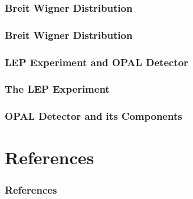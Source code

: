 \documentclass[10pt]{beamer}
\begin{document}
\subsubsection{Breit Wigner Distribution}
\begin{frame}
\frametitle{Breit Wigner Distribution}
\end{frame}
\subsubsection{LEP Experiment and OPAL Detector}
\begin{frame}
\frametitle{The LEP Experiment}
\end{frame}
\begin{frame}
\frametitle{OPAL Detector and its Components}
\end{frame}
\section*{References}
\begin{frame}
\frametitle{References}
\printbibliography
\end{frame}
\end{document}
